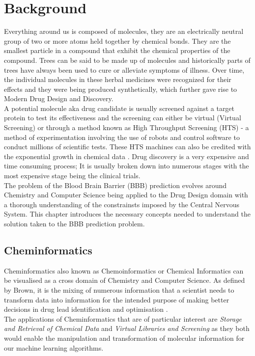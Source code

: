 \documentclass[a4paper,12pt]{report}
\begin{document}
\chapter{Background}
	Everything around us is composed of molecules, they are an electrically neutral group of two or more atoms held together by chemical bonds. They are the smallest particle in a compound that exhibit the chemical properties of the compound. 
	Trees can be said to be made up of molecules and historically parts of trees have always been used to cure or alleviate symptoms of illness. Over time, the individual molecules in these herbal medicines were recognized for their effects and they were being produced synthetically, which further gave rise to Modern Drug Design and Discovery. \\
	A potential molecule aka drug candidate is usually screened against a target protein to test its effectiveness and the screening can either be virtual (Virtual Screening) or through a method known as High Throughput Screening (HTS) - a method of experimentation involving the use of robots and control software to conduct millions of scientific tests. These HTS machines can also be credited with the exponential growth in chemical data \cite{Dougetal2008}.
	Drug discovery is a very expensive and time consuming process; It is usually broken down into numerous stages with the most expensive stage being the clinical trials. \\
	The problem of the Blood Brain Barrier (BBB) prediction evolves around Chemistry and Computer Science being applied to the Drug Design domain with a thorough understanding of the constrainsts imposed by the Central Nervous System. This chapter introduces the necessary concepts needed to understand the solution taken to the BBB prediction problem.
	
	
	\section{Cheminformatics}
	Cheminformatics also known as Chemoinformatics or Chemical Informatics can be visualised as a cross domain of Chemistry and Computer Science. As defined by Brown, it is the mixing of numerous information that a scientist needs to transform data into information for the intended purpose of making better decisions in drug lead identification and optimisation \cite{FKBrown1998}. \\
	The applications of Cheminformatics that are of particular interest are \textit{Storage and Retrieval of Chemical Data} and \textit{Virtual Libraries and Screening} as they both would enable the manipulation and transformation of molecular information for our machine learning algorithms. 
\end{document}
